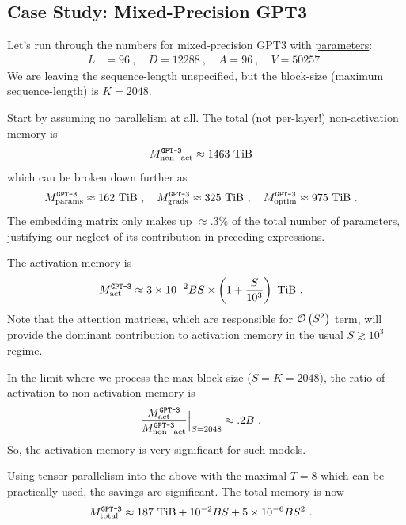 \documentclass[11pt]{article}
\begin{document}
\subsection{Case Study: Mixed-Precision GPT3 \label{subsec_gpt_mem_study} }

Let's run through the numbers for mixed-precision GPT3 with
\href{https://bmk.sh/2020/05/29/GPT-3-A-Brief-Summary/}{parameters}:
\begin{align}
	L & = 96 \ , \quad
	D = 12288 \ ,\quad
	A = 96\ , \quad V = 50257\ .
	\label{eq_gpt_num}
\end{align}
We are leaving the sequence-length unspecified, but the block-size (maximum sequence-length) is $
	K=2048 $.


Start by assuming no parallelism at all. The total (not per-layer!) non-activation memory is
\begin{align}
	M _{ {\rm non-act}  } ^ \texttt{GPT-3} & \approx 1463\ {\rm TiB}
\end{align}
which can be broken down further as
\begin{align}
	M _{ {\rm params}  } ^ \texttt{GPT-3} & \approx 162\ {\rm TiB} \ , \quad
	M _{ {\rm grads}  } ^ \texttt{GPT-3}  \approx 325\ {\rm TiB}\ , \quad
	M _{ {\rm optim}  } ^ \texttt{GPT-3}  \approx 975\ {\rm TiB}\ .
\end{align}
The embedding matrix only makes up $ \approx .3\% $ of the total number of parameters, justifying our
neglect of its contribution in preceding expressions.


The activation memory is
\begin{align}
	M _{ {\rm act}  } ^ \texttt{GPT-3} & \approx 3 \times 10 ^{ -2 }BS\times  \left (  1  + \frac{ S
	}{ 10 ^{ 3 } } \right ) \ {\rm TiB} \ .
\end{align}
Note that the attention matrices, which are responsible for $ \mathcal{O} \left( S ^{ 2 } \right)  $ term, will
provide the dominant contribution to activation memory in the usual $ S \gtrsim 10 ^{ 3 } $ regime.

In the limit where we process the max block size ($ S=K=2048 $), the ratio of activation to
non-activation memory is
\begin{align}
	\frac{  M _{ {\rm act}  } ^ \texttt{GPT-3}}{ M _{ {\rm non-act}  } ^ \texttt{GPT-3} }\Big| _{
	S=2048 } & \approx  .2 B \ .
\end{align}
So, the activation memory is very significant for such models.


Using tensor parallelism into the above with the maximal $ T=8 $ which can be practically used, the
savings are significant. The total memory is now
\begin{align}
	M _{ {\rm total}  } ^{ \texttt{GPT-3}  } & \approx 187\ {\rm TiB} + 10 ^{ -2 }BS + 5 \times 10 ^{
			-6} BS ^{ 2 }\ .
\end{align}
\end{document}
